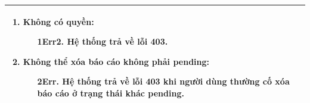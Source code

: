 {\begin{tabularx}{\textwidth}{|>{\raggedright\arraybackslash}X|>{\raggedright\arraybackslash}X|}
\begin{enumerate}
    \item \textbf{Không có quyền:}
    \begin{enumerate}
        \item[1Err2.] Hệ thống trả về lỗi 403.
    \end{enumerate}
    \item \textbf{Không thể xóa báo cáo không phải pending:}
    \begin{enumerate}
        \item[2Err.] Hệ thống trả về lỗi 403 khi người dùng thường cố xóa báo cáo ở trạng thái khác pending.
    \end{enumerate}
\end{enumerate} \\
\hline
\end{tabularx}
}
